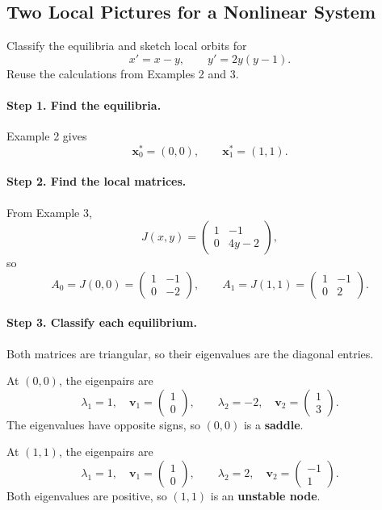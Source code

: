 \documentclass[10pt,letterpaper]{article}
\begin{document}
\subsection{Two Local Pictures for a Nonlinear System}
\begin{example}[5]{
Classify the equilibria and sketch local orbits for
\[
x'=x-y,\qquad y'=2y(y-1).
\]
Reuse the calculations from Examples 2 and 3.
}
\paragraph{Step 1. Find the equilibria.}
Example 2 gives
\[
\mathbf{x}_0^*=(0,0),\qquad \mathbf{x}_1^*=(1,1).
\]

\paragraph{Step 2. Find the local matrices.}
From Example 3,
\[
J(x,y)=\begin{pmatrix}1&-1\\0&4y-2\end{pmatrix},
\]
so
\[
A_0=J(0,0)=\begin{pmatrix}1&-1\\0&-2\end{pmatrix},
\qquad
A_1=J(1,1)=\begin{pmatrix}1&-1\\0&2\end{pmatrix}.
\]

\paragraph{Step 3. Classify each equilibrium.}
Both matrices are triangular, so their eigenvalues are the diagonal entries.

At $(0,0)$, the eigenpairs are
\[
\lambda_1=1,\quad \mathbf{v}_1=\begin{pmatrix}1\\0\end{pmatrix},
\qquad
\lambda_2=-2,\quad \mathbf{v}_2=\begin{pmatrix}1\\3\end{pmatrix}.
\]
The eigenvalues have opposite signs, so $(0,0)$ is a \textbf{saddle}.

At $(1,1)$, the eigenpairs are
\[
\lambda_1=1,\quad \mathbf{v}_1=\begin{pmatrix}1\\0\end{pmatrix},
\qquad
\lambda_2=2,\quad \mathbf{v}_2=\begin{pmatrix}-1\\1\end{pmatrix}.
\]
Both eigenvalues are positive, so $(1,1)$ is an \textbf{unstable node}.


\end{example}
\end{document}
